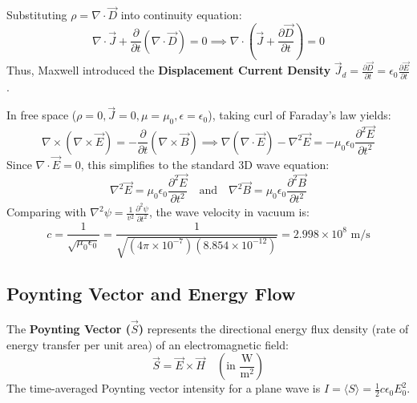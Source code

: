 \documentclass[12pt,a4paper]{article}
\begin{document}
Substituting $\rho = \nabla \cdot \vec{D}$ into continuity equation:
\begin{equation}
\nabla \cdot \vec{J} + \frac{\partial}{\partial t}(\nabla \cdot \vec{D}) = 0 \implies \nabla \cdot \left( \vec{J} + \frac{\partial \vec{D}}{\partial t} \right) = 0
\end{equation}
Thus, Maxwell introduced the \textbf{Displacement Current Density} $\vec{J}_d = \frac{\partial \vec{D}}{\partial t} = \epsilon_0 \frac{\partial \vec{E}}{\partial t}$.

\begin{tcolorbox}[formulabox, title={\textbf{Electromagnetic Wave Equation and Speed of Light}}]
In free space ($\rho = 0, \vec{J} = 0, \mu = \mu_0, \epsilon = \epsilon_0$), taking curl of Faraday's law yields:
\begin{equation}
\nabla \times (\nabla \times \vec{E}) = -\frac{\partial}{\partial t}(\nabla \times \vec{B}) \implies \nabla(\nabla \cdot \vec{E}) - \nabla^2 \vec{E} = -\mu_0 \epsilon_0 \frac{\partial^2 \vec{E}}{\partial t^2}
\end{equation}
Since $\nabla \cdot \vec{E} = 0$, this simplifies to the standard 3D wave equation:
\begin{equation}
\nabla^2 \vec{E} = \mu_0 \epsilon_0 \frac{\partial^2 \vec{E}}{\partial t^2} \quad \text{and} \quad \nabla^2 \vec{B} = \mu_0 \epsilon_0 \frac{\partial^2 \vec{B}}{\partial t^2}
\end{equation}
Comparing with $\nabla^2 \psi = \frac{1}{v^2}\frac{\partial^2\psi}{\partial t^2}$, the wave velocity in vacuum is:
\begin{equation}
c = \frac{1}{\sqrt{\mu_0 \epsilon_0}} = \frac{1}{\sqrt{(4\pi \times 10^{-7}) (8.854 \times 10^{-12})}} = 2.998 \times 10^8 \text{ m/s}
\end{equation}
\end{tcolorbox}

\subsection{Poynting Vector and Energy Flow}

\begin{tcolorbox}[defbox, title={\textbf{Definition: Poynting Vector}}]
The \textbf{Poynting Vector ($\vec{S}$)} represents the directional energy flux density (rate of energy transfer per unit area) of an electromagnetic field:
\begin{equation}
\vec{S} = \vec{E} \times \vec{H} \quad \left(\text{in } \frac{\text{W}}{\text{m}^2}\right)
\end{equation}
The time-averaged Poynting vector intensity for a plane wave is $I = \langle S \rangle = \frac{1}{2} c \epsilon_0 E_0^2$.
\end{tcolorbox}
\end{document}
